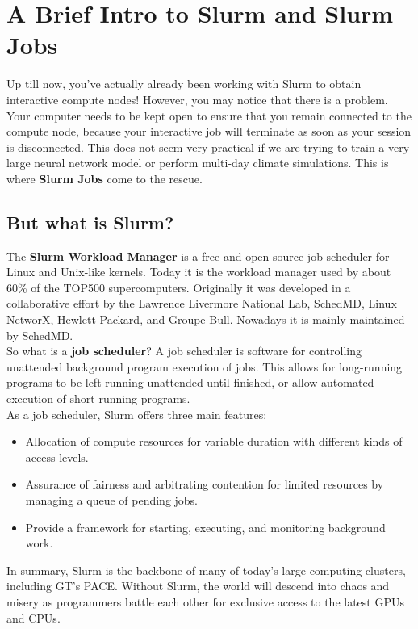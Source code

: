 \documentclass{article}
\begin{document}
\section{A Brief Intro to Slurm and Slurm Jobs}

Up till now, you've actually already been working with Slurm to obtain interactive compute nodes! However, you may notice that there is a problem. Your computer needs to be kept open to ensure that you remain connected to the compute node, because your interactive job will terminate as soon as your session is disconnected. This does not seem very practical if we are trying to train a very large neural network model or perform multi-day climate simulations. This is where \textbf{Slurm Jobs} come to the rescue. 

\subsection{But what is Slurm?}

The \textbf{Slurm Workload Manager} is a free and open-source job scheduler for Linux and Unix-like kernels. Today it is the workload manager used by about 60\% of the TOP500 supercomputers. Originally it was developed in a collaborative effort by the Lawrence Livermore National Lab, SchedMD, Linux NetworX, Hewlett-Packard, and Groupe Bull. Nowadays it is mainly maintained by SchedMD. \\

\noindent So what is a \textbf{job scheduler}? A job scheduler is software for controlling unattended background program execution of jobs. This allows for long-running programs to be left running unattended until finished, or allow automated execution of short-running programs. \\ 

\noindent As a job scheduler, Slurm offers three main features:

\begin{itemize}
    \item Allocation of compute resources for variable duration with different kinds of access levels. 
    \item Assurance of fairness and arbitrating contention for limited resources by managing a queue of pending jobs.
    \item Provide a framework for starting, executing, and monitoring background work.   
\end{itemize}

\noindent In summary, Slurm is the backbone of many of today's large computing clusters, including GT's PACE. Without Slurm, the world will descend into chaos and misery as programmers battle each other for exclusive access to the latest GPUs and CPUs. 
\end{document}
